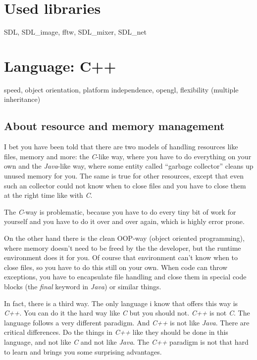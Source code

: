 \documentclass[english,a4paper,12pt]{report}
\begin{document}
\section{Used libraries}

SDL, SDL\_image, fftw, SDL\_mixer, SDL\_net

\section{Language: C++}

speed, object orientation, platform independence, opengl, flexibility (multiple inheritance)

\subsection{About resource and memory management}

I bet you have been told that there are two models of handling resources
like files, memory and more: the \emph{C}-like way, where you have to do
everything on your own and the \emph{Java}-like way, where some entity
called ``garbage collector'' cleans up unused memory for you. The same
is true for other resources, except that even such an collector could
not know when to close files and you have to close them at the right
time like with \emph{C}.

The \emph{C}-way is problematic, because you have to do every tiny bit
of work for yourself and you have to do it over and over again, which is
highly error prone.

On the other hand there is the clean OOP-way (object oriented
programming), where memory doesn't need to be freed by the the
developer, but the runtime environment does it for you. Of course that
environment can't know when to close files, so you have to do this still
on your own. When code can throw exceptions, you have to encapsulate
file handling and close them in special code blocks (the \emph{final}
keyword in \emph{Java}) or similar things.

In fact, there is a third way. The only language i know that offers this
way is \emph{C++}. You can do it the hard way like \emph{C} but you
should not. \emph{C++} is not \emph{C}. The language follows a very
different paradigm. And \emph{C++} is not like \emph{Java}. There are
critical differences. Do the things in \emph{C++} like they should be
done in this language, and not like \emph{C} and not like \emph{Java}.
The \emph{C++} paradigm is not that hard to learn and brings you some
surprising advantages.
\end{document}
